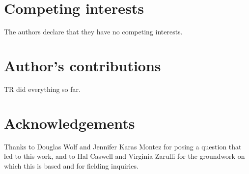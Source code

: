 \documentclass{bmcart}
\begin{document}
\begin{backmatter}

\section*{Competing interests}
  The authors declare that they have no competing interests.

\section*{Author's contributions}
    TR did everything so far.

\section*{Acknowledgements}
  Thanks to Douglas Wolf and Jennifer Karas Montez for posing a question that led to this work, and to Hal Caswell and Virginia Zarulli for the groundwork on which this is based and for fielding inquiries.




\end{backmatter}
\end{document}
